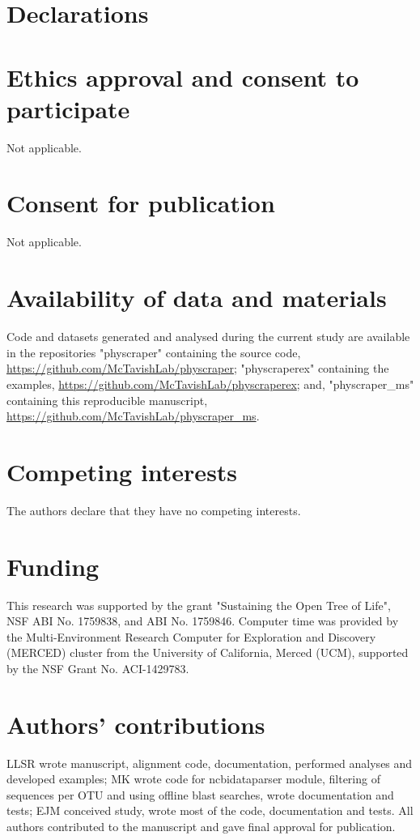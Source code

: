 \documentclass{bmcart}
\begin{document}
\section*{Declarations}

\begin{backmatter}

\section*{Ethics approval and consent to participate}
Not applicable.

\section*{Consent for publication}
Not applicable.

\section*{Availability of data and materials}

Code and datasets generated and analysed during the current study are available in
the repositories "physcraper" containing the source code,
\href{https://github.com/McTavishLab/physcraper}{https://github.com/McTavishLab/physcraper};
"physcraperex" containing the examples,
\href{https://github.com/McTavishLab/physcraperex}{https://github.com/McTavishLab/physcraperex};
and, "physcraper\_ms" containing this reproducible manuscript,
\href{https://github.com/McTavishLab/physcraper\_ms}{https://github.com/McTavishLab/physcraper\_ms}.

\section*{Competing interests}
The authors declare that they have no competing interests.

\section*{Funding}
This research was supported by the grant "Sustaining the Open Tree of Life", NSF ABI
No. 1759838, and ABI No. 1759846.
Computer time was provided by the Multi-Environment Research Computer for
Exploration and Discovery (MERCED) cluster from the University of California,
Merced (UCM), supported by the NSF Grant No. ACI-1429783.

\section*{Authors' contributions}
LLSR wrote manuscript, alignment code, documentation, performed analyses and developed examples; MK wrote code for ncbidataparser module, filtering of sequences per OTU and using offline blast searches, wrote documentation and tests; EJM conceived study, wrote most of the code, documentation and tests.
All authors contributed to the manuscript and gave final approval for publication.



\end{backmatter}
\end{document}
